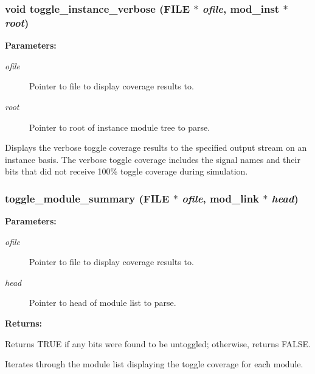 \subsubsection{\setlength{\rightskip}{0pt plus 5cm}void toggle\_\-instance\_\-verbose (FILE $\ast$ {\em ofile}, {\bf mod\_\-inst} $\ast$ {\em root})}\label{toggle_8c_a8}


\begin{Desc}
\item[{\bf Parameters: }]\par
\begin{description}
\item[
{\em ofile}]Pointer to file to display coverage results to. \item[
{\em root}]Pointer to root of instance module tree to parse.

\end{description}
\end{Desc}
Displays the verbose toggle coverage results to the specified output stream on an instance basis. The verbose toggle coverage includes the signal names and their bits that did not receive 100\% toggle coverage during simulation. 
\subsubsection{ toggle\_\-module\_\-summary (FILE $\ast$ {\em ofile}, {\bf mod\_\-link} $\ast$ {\em head})}\label{toggle_8c_a6}


\begin{Desc}
\item[{\bf Parameters: }]\par
\begin{description}
\item[
{\em ofile}]Pointer to file to display coverage results to. \item[
{\em head}]Pointer to head of module list to parse.

\end{description}
\end{Desc}
\begin{Desc}
\item[{\bf Returns: }]\par
Returns TRUE if any bits were found to be untoggled; otherwise, returns FALSE.

\end{Desc}
Iterates through the module list displaying the toggle coverage for each module. 

